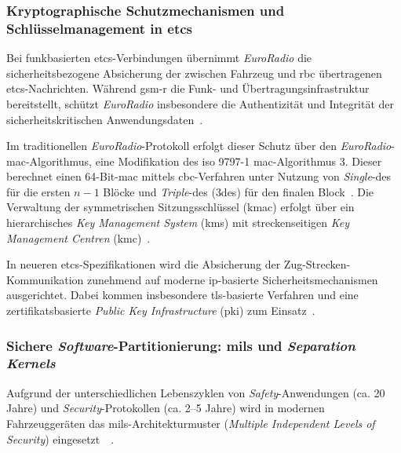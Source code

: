 \documentclass[runningheads]{res/llncs}
\begin{document}
\subsubsection{\texorpdfstring{Kryptographische Schutzmechanismen und Schlüsselmanagement in \gls{etcs}}{Kryptographische Schutzmechanismen und Schlüsselmanagement in ETCS}}
\label{sec:Kryptographische_Schutzmechanismen_und_Schlüsselmanagement_in_ETCS}
Bei funkbasierten \gls{etcs}-Verbindungen übernimmt \textit{EuroRadio} die sicherheitsbezogene Absicherung der zwischen Fahrzeug und \gls{rbc} übertragenen \gls{etcs}-Nachrichten. Während \gls{gsm-r} die Funk- und Übertragungsinfrastruktur bereitstellt, schützt \textit{EuroRadio} insbesondere die Authentizität und Integrität der sicherheitskritischen Anwendungsdaten~\parencite[S. 744, 751]{chothiaAttack2017}.

Im traditionellen \textit{EuroRadio}-Protokoll erfolgt dieser Schutz über den \textit{EuroRadio}-\gls{mac}-Algorithmus, eine Modifikation des \gls{iso} 9797-1 \gls{mac}-Algorithmus 3. Dieser berechnet einen 64-Bit-\gls{mac} mittels \gls{cbc}-Verfahren unter Nutzung von \textit{Single}-\gls{des} für die ersten $n-1$ Blöcke und \textit{Triple}-\gls{des} (\gls{3des}) für den finalen Block~\parencite[S. 751]{chothiaAttack2017}. Die Verwaltung der symmetrischen Sitzungsschlüssel (\gls{kmac}) erfolgt über ein hierarchisches \textit{Key Management System} (\gls{kms}) mit streckenseitigen \textit{Key Management Centren} (\gls{kmc})~\parencite[S. 90, 100]{trinckaufETCS2024}.

In neueren \gls{etcs}-Spezifikationen wird die Absicherung der Zug-Strecken-Kommunikation zunehmend auf moderne \gls{ip}-basierte Sicherheitsmechanismen ausgerichtet. Dabei kommen insbesondere \gls{tls}-basierte Verfahren und eine zertifikatsbasierte \textit{Public Key Infrastructure} (\gls{pki}) zum Einsatz~\parencite[S. 105, 211]{trinckaufETCS2024}.

\subsubsection{\texorpdfstring{Sichere \textit{Software}-Partitionierung: \gls{mils} und \textit{Separation Kernels}}{Sichere Software-Partitionierung: MILS und Separation Kernels}}
\label{sec:Sichere_Software-Partitionierung_MILS_und_Separation_Kernels}
Aufgrund der unterschiedlichen Lebenszyklen von \textit{Safety}-Anwendungen (ca. 20 Jahre) und \textit{Security}-Protokollen (ca. 2--5 Jahre) wird in modernen Fahrzeuggeräten das \gls{mils}-Architekturmuster (\textit{Multiple Independent Levels of Security}) eingesetzt~\parencite[S. 31--32]{schulzIntegration2019}~\parencite[S. 80--81]{tverdyshevCertMILS2019}. 
\end{document}
